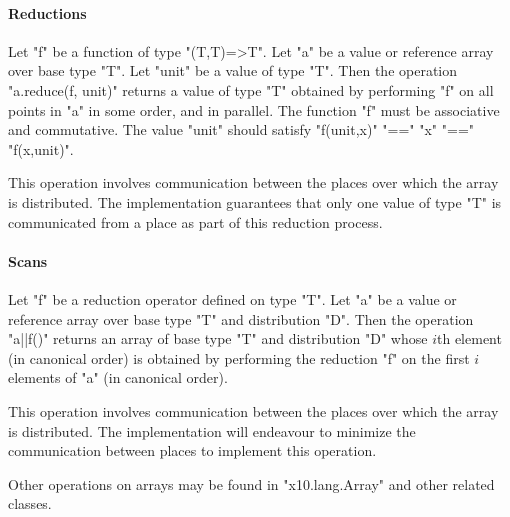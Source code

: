 \paragraph{Reductions}\label{ArrayReductions}

Let \xcd"f" be a function of type \xcd"(T,T)=>T".  Let
\xcd"a" be a value or reference array over base type \xcd"T".
Let \xcd"unit" be a value of type \xcd"T".
Then the
operation \xcd"a.reduce(f, unit)" returns a value of type \xcd"T" obtained
by performing \xcd"f" on all points in \xcd"a" in some order, and in
parallel.  The function \xcd"f" must be associative and
commutative.  The value \xcd"unit" should satisfy
\xcd"f(unit,x)" \xcd"==" \xcd"x" \xcd"==" \xcd"f(x,unit)".

This operation involves communication between the places over which
the array is distributed. The \Xten{} implementation guarantees that
only one value of type \xcd"T" is communicated from a place as part of
this reduction process.

\paragraph{Scans}\label{ArrayScans}

Let \xcd"f" be a reduction operator defined on type \xcd"T". Let
\xcd"a" be a value or reference array over base type \xcd"T" and
distribution \xcd"D". Then the operation \xcd"a||f()" returns an array
of base type \xcd"T" and distribution \xcd"D" whose $i$th element
(in canonical order) is obtained by performing the reduction \xcd"f"
on the first $i$ elements of \xcd"a" (in canonical order).

This operation involves communication between the places over which
the array is distributed. The \Xten{} implementation will endeavour to
minimize the communication between places to implement this operation.

Other operations on arrays may be found in \xcd"x10.lang.Array" and
other related classes.
